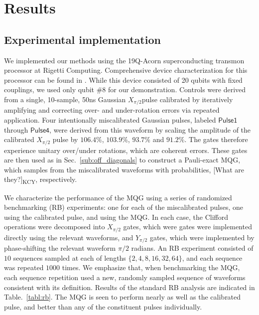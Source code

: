 \documentclass[aps,nofootinbib,pra,notitlepage,twocolumn]{revtex4-1}
\newcommand{\kcy}[1]{{\color{red}[#1]\textsubscript{\rm{KCY}}}}
\newcommand{\0}{\ensuremath{\mathbf{0}}}
\begin{document}
\section{Results} %
\label{sec:results}


\subsection{Experimental implementation} %
\label{sub:experimental}
\noindent We implemented our methods using the 19Q-Acorn superconducting transmon processor at Rigetti Computing. Comprehensive device characterization for this processor can be found in \cite{1712.05771}. While this device consisted of 20 qubits with fixed couplings, we used only qubit \#8 for our demonstration. Controls were derived from a single, 10-sample, 50ns Gaussian $X_{\pi/2}$pulse calibrated by iteratively amplifying and correcting over- and under-rotation errors via repeated application. Four intentionally miscalibrated Gaussian pulses, labeled $\mathsf{Pulse1}$ through $\mathsf{Pulse4}$, were derived from this waveform by scaling the amplitude of the calibrated $X_{\pi/2}$ pulse by $106.4\%$,  $103.9\%$, $93.7\%$ and $91.2\%$. The gates therefore experience unitary over/under rotations, which are coherent errors. These gates are then used as in Sec.~\ref{sub:off_diagonals} to construct a Pauli-exact MQG, which samples from the miscalibrated waveforms with probabilities, \kcy{What are they?}, respectively. 

We characterize the performance of the MQG using a series of randomized benchmarking (RB) experiments\cite{Magesan2011}: one for each of the miscalibrated pulses, one using the calibrated pulse, and using the MQG. In each case, the Clifford operations were decomposed into $X_{\pi/2}$ gates, which were gates were implemented directly using the relevant waveforms, and $Y_{\pi/2}$ gates, which were implemented by phase-shifting the relevant waveform $\pi/2$ radians.  An RB experiment consisted of $10$ sequences sampled at each of lengths $\{2, 4, 8, 16, 32, 64\}$, and each sequence was repeated $1000$ times. We emphasize that, when benchmarking the MQG, each sequence repetition used a new, randomly sampled sequence of waveforms consistent with its definition.  Results of the standard RB analysis are indicated in Table.~\eqref{tabl:rb}. The MQG is seen to perform nearly as well as the calibrated pulse, and better than any of the constituent pulses individually.  
\end{document}
